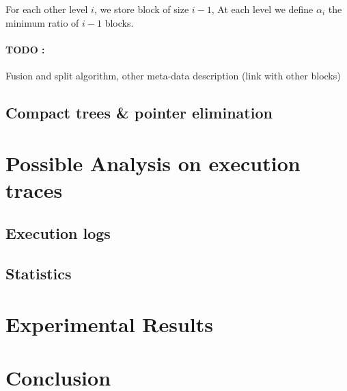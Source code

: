 \documentclass[12pt]{article}
\begin{document}
For each other level $i$, we store block of size $i-1$, At each level we define
$\alpha_i$ the minimum ratio of $i-1$ blocks.


\paragraph{TODO :} Fusion and split algorithm, other meta-data description (link
with other blocks)




\subsection{Compact trees \& pointer elimination}







\section{Possible Analysis on execution traces}
\label{logs}

\subsection{Execution logs}

\subsection{Statistics}

\section{Experimental Results}



\section{Conclusion}
\end{document}
